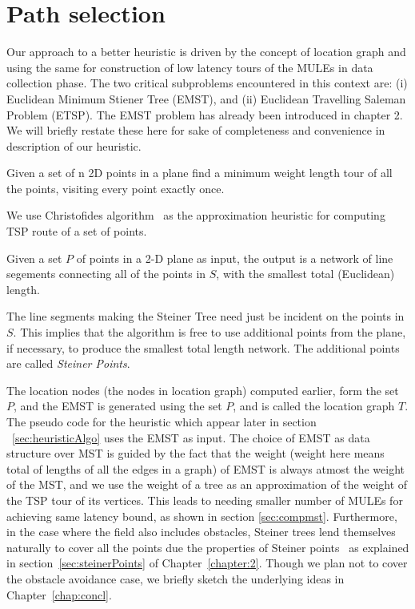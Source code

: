 \chapter{Path selection} \label{chap:steiner}


Our approach to a better heuristic is driven by the concept of location graph and using the same for construction of low latency tours of the MULEs in data collection phase. The two critical subproblems encountered in this context are: 
(i) Euclidean Minimum Stiener Tree (EMST), and (ii)  Euclidean Travelling Saleman Problem (ETSP). The EMST problem has already been introduced in chapter 2. We will briefly restate these here for sake of completeness and convenience in description of our heuristic.

\begin{definition}
Given a set of n 2D points in a plane find a minimum weight length tour of all the points, visiting every point exactly once.
\end{definition}
We use Christofides algorithm~\cite{christofides} as the approximation heuristic for computing TSP route of a set of points.

\begin{definition}
Given a set $P$ of points in a 2-D plane as input, the output is a network of line segements connecting all of the points in $S$, with the smallest total (Euclidean) length.
\end{definition}
The line segments making the Steiner Tree need just be incident on the points in $S$. This implies that the algorithm is free to use additional points from the plane, if necessary, to produce the smallest total length network. The additional points are called {\em Steiner Points}.

The location nodes (the nodes in location graph) computed earlier, form the set $P$, and the EMST is generated using the set $P$, and is called the location graph $T$. The pseudo code for the heuristic which appear later in section ~\ref{sec:heuristicAlgo} uses the EMST as input. The choice of EMST as data structure over MST is guided by the fact that the weight (weight here means total of lengths of all the edges in a graph) of EMST is always atmost the weight of the MST, and we use the weight of a tree as an approximation of the weight of the TSP tour of its vertices. This leads to needing smaller number of MULEs for achieving same latency bound, as shown in section \ref{sec:compmst}. Furthermore, in the case where the field also includes obstacles, Steiner trees lend themselves naturally to cover all the points due the properties of Steiner points~\cite{oaest99} as explained in section~\ref{sec:steinerPoints} of Chapter~\ref{chapter:2}. Though we plan not to cover the obstacle avoidance case, we briefly sketch the underlying ideas in Chapter~\ref{chap:concl}. 



